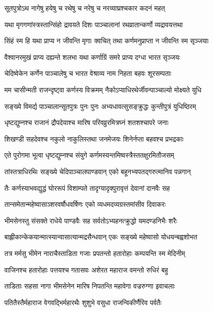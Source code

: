 \twolineshloka
{सूतपुत्रोऽथ नागेषु हयेषु च रथेषु च}
{नरेषु च नरव्याघ्रश्चकार कदनं महत्}


\twolineshloka
{यथा मृगगणांस्त्रस्तान्सिंहो द्रावयते दिशः}
{पाञ्चालानां रथव्रातान्कर्णो व्यद्रावयत्तथा}


\twolineshloka
{सिंहं स्म हि यथा प्राप्य न जीवन्ति मृगाः क्वचित्}
{तथा कर्णमनुप्राप्ता न जीवन्ति स्म सृञ्जयाः}


\twolineshloka
{वैश्वानरमुखं प्राप्य दह्यन्ते शलभा यथा}
{कर्णाग्रिं समरे प्राप्य दग्धा भारत सृञ्जयः}


\twolineshloka
{चेदिष्वेकेन कर्णेन पाञ्चालेषु च भारत}
{वेश्राव्य नाम निहता बहवः शूरसम्पताः}


\twolineshloka
{मम चासीन्मती राजन्दृष्ट्वा कर्णस्य विक्रमम्}
{नैकोऽप्याधिरथेर्जीवन्पाञ्चाल्यो मोक्ष्यते युधि}


\twolineshloka
{सङ्ख्ये विमर्द्य पाञ्चालान्सूतपुत्रः पुनः पुनः}
{अभ्यधावत्सुसङ्क्रुद्धः कुन्तीपुत्रं युधिष्ठिरम्}


\twolineshloka
{धृष्टद्युम्नश्च राजानं द्रौपदेयाश्च मारिष}
{परिवव्रुरमित्रघ्नं शतशश्चापरे जनाः}


\twolineshloka
{शिखण्डी सहदेवश्च नकुलो नाकुलिस्तथा}
{जनमेजयः शिनेर्नप्ता बहवश्च प्रभद्रकाः}


\twolineshloka
{एते पुरोगमा भूत्वा धृष्टद्युम्नश्च संयुगे}
{कर्णमस्यन्तमिष्वस्त्रैस्ततक्षुरमितौजसम्}


\twolineshloka
{तांस्तत्राधिरथिः सङ्ख्ये चेदिपाञ्चालपाण्डवान्}
{एको बहूनभ्यपतद्गरुत्मानिव पन्नगान्}


\twolineshloka
{तैः कर्णस्याभवद्युद्धं घोररूपं विशाम्पते}
{तादृग्यादृक्पुरावृत्तं देवानां दानवैः सह}


\twolineshloka
{तान्समेतान्महेष्वासाञ्शरवर्षौधवर्षिणः}
{एको व्यधमदव्यग्रस्तमांसीव दिवाकरः}


\twolineshloka
{भीमसेनस्तु संसक्ते राधेये पाण्डवैः सह}
{सर्वतोऽभ्यहनत्क्रुद्धो यमदण्डनिभैः शरैः}


\twolineshloka
{बाह्लीकान्केकयान्मात्स्यान्वासात्यान्मद्रसैन्धवान्}
{एकः सङ्ख्ये महेष्वासो योधयन्बह्वशोभत}


\twolineshloka
{तत्र मर्मसु भीमेन नाराचैस्ताडिता गजाः}
{प्रपतन्तो हतारोहाः कम्पयन्ति स्म मेदिनीम्}


\twolineshloka
{वाजिनश्च हतारोहाः पत्तयश्च गतासवः}
{अशेरत महाराज वमन्तो रुधिरं बहु}


\twolineshloka
{ताडिताः सहसा नागा भीमसेनेन मारिष}
{निपतन्ति महावेगा वज्ररुग्णा इवाचलाः}


\twolineshloka
{पतितैस्तैर्महाराज वेगवद्भिर्महारथैः}
{शुशुभे वसुधा राजन्विकीर्णैरिव पर्वतैः}


